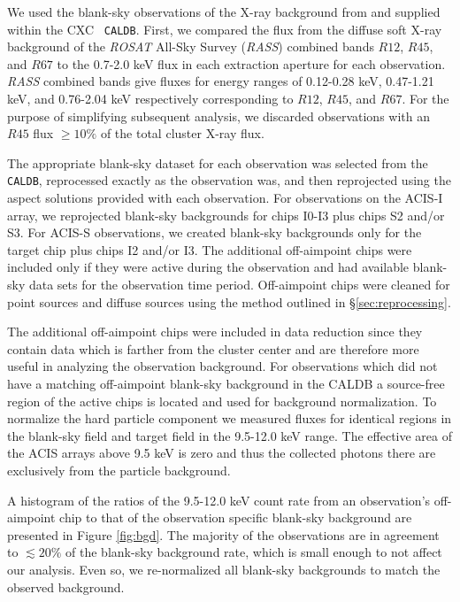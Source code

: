 \documentclass{emulateapj}
\begin{document}
We used the blank-sky observations of the X-ray background from
\cite{2001ApJ...562L.153M} and supplied within the CXC {\tt
CALDB}. First, we compared the flux from the diffuse soft X-ray
background of the {\textit{ROSAT}} All-Sky Survey ({\it RASS})
combined bands $R12$, $R45$, and $R67$ to the 0.7-2.0 keV flux in each
extraction aperture for each observation. {\it RASS} combined bands
give fluxes for energy ranges of 0.12-0.28 keV, 0.47-1.21 keV, and
0.76-2.04 keV respectively corresponding to $R12$, $R45$, and $R67$. For
the purpose of simplifying subsequent analysis, we discarded
observations with an $R45$ flux $\geq 10\%$ of the total cluster X-ray
flux.

The appropriate blank-sky dataset for each observation was
selected from the {\tt CALDB}, reprocessed exactly as the
observation was, and then reprojected using the aspect solutions provided
with each observation. For observations on the ACIS-I array, we
reprojected blank-sky backgrounds for chips I0-I3 plus chips S2 and/or
S3. For ACIS-S observations, we created blank-sky backgrounds only for
the target chip plus chips I2 and/or I3. The additional off-aimpoint
chips were included only if they were active during the observation
and had available blank-sky data sets for the observation time
period. Off-aimpoint chips were cleaned for point sources and diffuse
sources using the method outlined in \S\ref{sec:reprocessing}.

The additional off-aimpoint chips were included in data reduction
since they contain data which is farther from the cluster center and
are therefore more useful in analyzing the observation background. For
observations which did not have a matching off-aimpoint blank-sky
background in the CALDB a source-free region of the active chips is
located and used for background normalization. To normalize the hard
particle component we measured fluxes for identical regions in the
blank-sky field and target field in the 9.5-12.0 keV range. The
effective area of the ACIS arrays above 9.5 keV is zero and thus the
collected photons there are exclusively from the particle background.

A histogram of the ratios of the 9.5-12.0 keV count rate from an
observation's off-aimpoint chip to that of the observation specific
blank-sky background are presented in Figure \ref{fig:bgd}. The
majority of the observations are in agreement to $\lesssim 20\%$ of
the blank-sky background rate, which is small enough to not affect our
analysis. Even so, we re-normalized all blank-sky backgrounds to match
the observed background.
\end{document}
